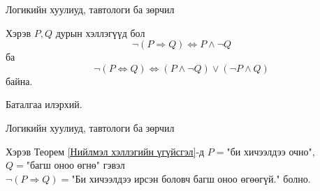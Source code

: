 \begin{frame}[allowframebreaks]{Логикийн хуулиуд, тавтологи ба зөрчил}
\begin{theorem}\label{Нийлмэл хэллэгийн үгүйсгэл}
Хэрэв $P, Q$ дурын хэллэгүүд бол 
$$\lnot(P\Rightarrow Q)\Leftrightarrow P\land\lnot Q$$ ба $$\lnot(P\Leftrightarrow Q)\Leftrightarrow(P\land\lnot Q)\lor(\lnot P\land Q)$$ байна.
    
\end{theorem}
\begin{prof}
    Баталгаа илэрхий.
\end{prof} 
\end{frame}

\begin{frame}[allowframebreaks]{Логикийн хуулиуд, тавтологи ба зөрчил}
\begin{example} Хэрэв Теорем \ref{Нийлмэл хэллэгийн үгүйсгэл}-д $P=\text{"би хичээлдээ очно"}$, $Q=\text{"багш оноо өгнө"}$ гэвэл $\lnot(P\Rightarrow Q)=\text{"Би хичээлдээ ирсэн боловч багш оноо өгөөгүй."}$ болно. 
\end{example}
\end{frame}

